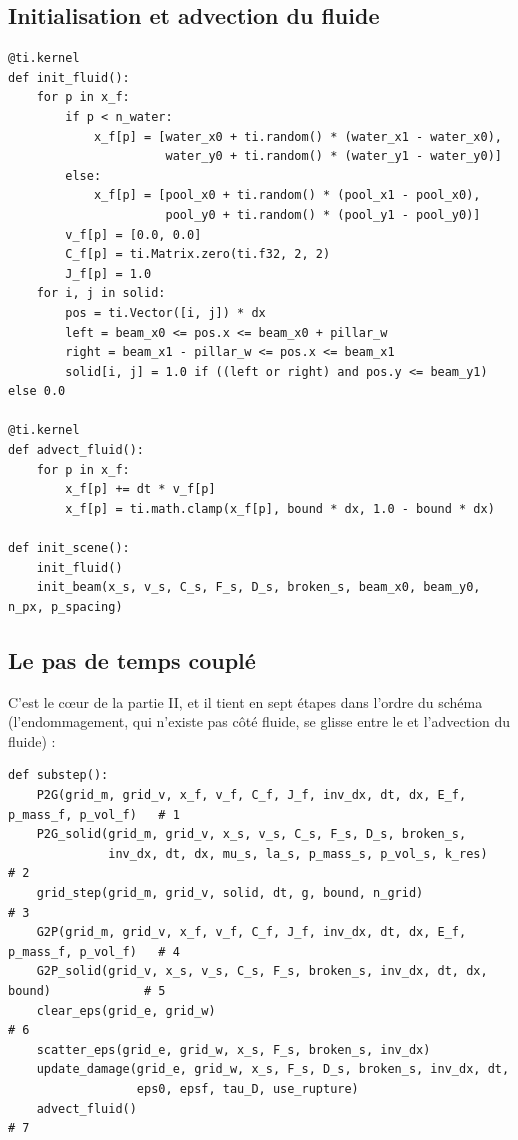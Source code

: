 \documentclass[11pt,a4paper]{article}
\newcommand{\code}[1]{\texttt{\detokenize{#1}}}
\begin{document}
\subsection{Initialisation et advection du fluide}

\begin{lstlisting}
@ti.kernel
def init_fluid():
    for p in x_f:
        if p < n_water:
            x_f[p] = [water_x0 + ti.random() * (water_x1 - water_x0),
                      water_y0 + ti.random() * (water_y1 - water_y0)]
        else:
            x_f[p] = [pool_x0 + ti.random() * (pool_x1 - pool_x0),
                      pool_y0 + ti.random() * (pool_y1 - pool_y0)]
        v_f[p] = [0.0, 0.0]
        C_f[p] = ti.Matrix.zero(ti.f32, 2, 2)
        J_f[p] = 1.0
    for i, j in solid:
        pos = ti.Vector([i, j]) * dx
        left = beam_x0 <= pos.x <= beam_x0 + pillar_w
        right = beam_x1 - pillar_w <= pos.x <= beam_x1
        solid[i, j] = 1.0 if ((left or right) and pos.y <= beam_y1) else 0.0

@ti.kernel
def advect_fluid():
    for p in x_f:
        x_f[p] += dt * v_f[p]
        x_f[p] = ti.math.clamp(x_f[p], bound * dx, 1.0 - bound * dx)

def init_scene():
    init_fluid()
    init_beam(x_s, v_s, C_s, F_s, D_s, broken_s, beam_x0, beam_y0, n_px, p_spacing)
\end{lstlisting}

\subsection{Le pas de temps couplé}

C'est le c\oe ur de la partie II, et il tient en sept étapes dans l'ordre du schéma (l'endommagement,
qui n'existe pas côté fluide, se glisse entre le \code{G2P_solid} et l'advection du fluide) :

\begin{lstlisting}
def substep():
    P2G(grid_m, grid_v, x_f, v_f, C_f, J_f, inv_dx, dt, dx, E_f, p_mass_f, p_vol_f)   # 1
    P2G_solid(grid_m, grid_v, x_s, v_s, C_s, F_s, D_s, broken_s,
              inv_dx, dt, dx, mu_s, la_s, p_mass_s, p_vol_s, k_res)                    # 2
    grid_step(grid_m, grid_v, solid, dt, g, bound, n_grid)                             # 3
    G2P(grid_m, grid_v, x_f, v_f, C_f, J_f, inv_dx, dt, dx, E_f, p_mass_f, p_vol_f)   # 4
    G2P_solid(grid_v, x_s, v_s, C_s, F_s, broken_s, inv_dx, dt, dx, bound)             # 5
    clear_eps(grid_e, grid_w)                                                          # 6
    scatter_eps(grid_e, grid_w, x_s, F_s, broken_s, inv_dx)
    update_damage(grid_e, grid_w, x_s, F_s, D_s, broken_s, inv_dx, dt,
                  eps0, epsf, tau_D, use_rupture)
    advect_fluid()                                                                     # 7
\end{lstlisting}
\end{document}
